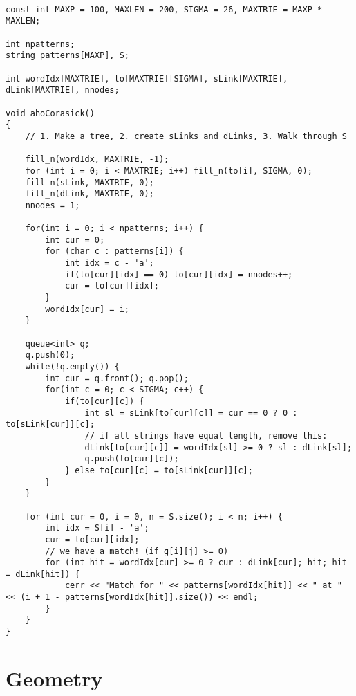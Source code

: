 \documentclass{article}
\begin{document}
\begin{lstlisting}

const int MAXP = 100, MAXLEN = 200, SIGMA = 26, MAXTRIE = MAXP * MAXLEN;

int npatterns;
string patterns[MAXP], S;

int wordIdx[MAXTRIE], to[MAXTRIE][SIGMA], sLink[MAXTRIE], dLink[MAXTRIE], nnodes;

void ahoCorasick()
{
    // 1. Make a tree, 2. create sLinks and dLinks, 3. Walk through S

    fill_n(wordIdx, MAXTRIE, -1);
    for (int i = 0; i < MAXTRIE; i++) fill_n(to[i], SIGMA, 0);
    fill_n(sLink, MAXTRIE, 0);
    fill_n(dLink, MAXTRIE, 0);
    nnodes = 1;

    for(int i = 0; i < npatterns; i++) {
        int cur = 0;
        for (char c : patterns[i]) {
            int idx = c - 'a';
            if(to[cur][idx] == 0) to[cur][idx] = nnodes++;
            cur = to[cur][idx];
        }
        wordIdx[cur] = i;
    }

    queue<int> q;
    q.push(0);
    while(!q.empty()) {
        int cur = q.front(); q.pop();
        for(int c = 0; c < SIGMA; c++) {
            if(to[cur][c]) {
                int sl = sLink[to[cur][c]] = cur == 0 ? 0 : to[sLink[cur]][c];
                // if all strings have equal length, remove this:
                dLink[to[cur][c]] = wordIdx[sl] >= 0 ? sl : dLink[sl];
                q.push(to[cur][c]);
            } else to[cur][c] = to[sLink[cur]][c];
        }
    }

    for (int cur = 0, i = 0, n = S.size(); i < n; i++) {
        int idx = S[i] - 'a';
        cur = to[cur][idx];
        // we have a match! (if g[i][j] >= 0)
        for (int hit = wordIdx[cur] >= 0 ? cur : dLink[cur]; hit; hit = dLink[hit]) {
            cerr << "Match for " << patterns[wordIdx[hit]] << " at " << (i + 1 - patterns[wordIdx[hit]].size()) << endl;
        }
    }
}

\end{lstlisting}

\section{Geometry}
\end{document}
